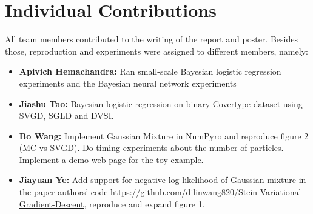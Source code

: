 \section{Individual Contributions}
All team members contributed to the writing of the report and poster. Besides those, reproduction and experiments were assigned to different members, namely:
\begin{itemize}
    \item \textbf{Apivich Hemachandra: } Ran small-scale Bayesian logistic regression experiments and the Bayesian neural network experiments
    \item \textbf{Jiashu Tao:} Bayesian logistic regression on binary Covertype dataset using SVGD, SGLD and DVSI.
    \item \textbf{Bo Wang:} Implement Gaussian Mixture in NumPyro and reproduce figure 2 (MC vs SVGD). Do timing experiments about the number of particles. Implement a demo web page for the toy example.
    \item \textbf{Jiayuan Ye:} Add support for negative log-likelihood of Gaussian mixture in the paper authors' code \url{https://github.com/dilinwang820/Stein-Variational-Gradient-Descent}, reproduce and expand figure 1. 
\end{itemize}